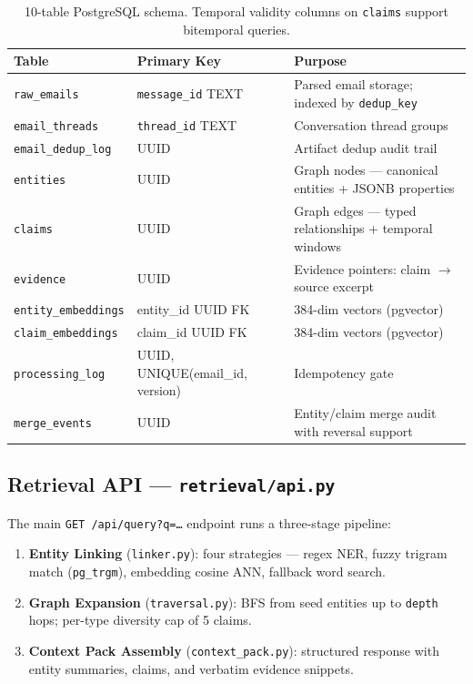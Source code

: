 \documentclass[11pt,a4paper]{article}
\newcommand{\code}[1]{\texttt{\small#1}}
\begin{document}
\begin{table}[H]
\centering
\small
\begin{tabularx}{\linewidth}{L{3.2cm} L{2.8cm} X}
\toprule
{}
\color{white}\textbf{Table} & \color{white}\textbf{Primary Key} & \color{white}\textbf{Purpose} \\
\midrule
\code{raw\_emails}         & \code{message\_id} TEXT & Parsed email storage; indexed by \code{dedup\_key} \\
\code{email\_threads}      & \code{thread\_id} TEXT  & Conversation thread groups \\
\code{email\_dedup\_log}   & UUID               & Artifact dedup audit trail \\
\code{entities}            & UUID               & Graph nodes — canonical entities + JSONB properties \\
\code{claims}              & UUID               & Graph edges — typed relationships + temporal windows \\
\code{evidence}            & UUID               & Evidence pointers: claim $\to$ source excerpt \\
\code{entity\_embeddings}  & entity\_id UUID FK & 384-dim vectors (pgvector) \\
\code{claim\_embeddings}   & claim\_id UUID FK  & 384-dim vectors (pgvector) \\
\code{processing\_log}     & UUID, UNIQUE(email\_id, version) & Idempotency gate \\
\code{merge\_events}       & UUID               & Entity/claim merge audit with reversal support \\
\bottomrule
\end{tabularx}
\caption{10-table PostgreSQL schema.  Temporal validity columns on
  \code{claims} support bitemporal queries.}
\end{table}

\subsection{Retrieval API — \code{retrieval/api.py}}

The main \code{GET /api/query?q=\ldots} endpoint runs a three-stage pipeline:

\begin{enumerate}[leftmargin=*, itemsep=3pt]
  \item \textbf{Entity Linking} (\code{linker.py}): four strategies —
    regex NER, fuzzy trigram match (\code{pg\_trgm}), embedding cosine ANN,
    fallback word search.
  \item \textbf{Graph Expansion} (\code{traversal.py}): BFS from seed entities
    up to \code{depth} hops; per-type diversity cap of 5 claims.
  \item \textbf{Context Pack Assembly} (\code{context\_pack.py}): structured
    response with entity summaries, claims, and verbatim evidence snippets.
\end{enumerate}
\end{document}
